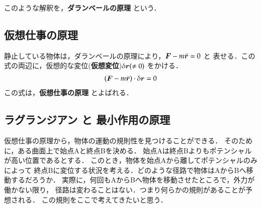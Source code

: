             このような解釈を，\textbf{ダランベールの原理} という．

        \subsection{仮想仕事の原理}
            静止している物体は，ダランベールの原理により，$\boldsymbol{F}-m\ddot{\boldsymbol{r}} = 0$ と
            表せる．この式の両辺に，仮想的な変位(\textbf{仮想変位})$\delta\boldsymbol{r} (\neq0)$ をかける．
                \begin{align}\label{k_sigo}
                    \left(\bF-m\ddot{\br}\right)\cdot\delta\br  = 0
                \end{align}
            この式は，\textbf{仮想仕事の原理} とよばれる．

        \subsection{ラグランジアン と 最小作用の原理}
            \begin{mycomment}
            仮想仕事の原理から，物体の運動の規則性を見つけることができる．
            そのために，ある曲面上で始点Aと終点Bを決める．
            始点Aは終点Bよりもポテンシャルが高い位置であるとする．
            このとき，物体を始点Aから離してポテンシャルのみによって
            終点Bに変位する状況を考える．どのような径路で物体はAからBへ移動するだろうか．
            実際に，何回もAからBへ物体を移動させたところで，外力が働かない限り，
            径路は変わることはない．つまり何らかの規則があることが予想される．
            この規則をここで考えてきたいと思う．
            \end{mycomment}

